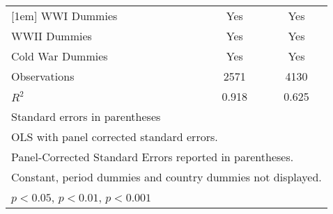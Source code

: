 \begin{table}[!htbp]
{\begin{tabular}{l*{2}{c}}
			[1em]
			WWI Dummies         &         Yes         &         Yes         \\
			[1em]
			WWII Dummies        &         Yes         &         Yes         \\
			[1em]
			Cold War Dummies    &         Yes         &         Yes         \\
			\hline
			Observations        &        2571         &        4130         \\
			\(R^{2}\)           &       0.918         &       0.625         \\
			\hline
			\multicolumn{7}{l}{\footnotesize Standard errors in parentheses}\\
			\multicolumn{7}{l}{\footnotesize OLS with panel corrected standard errors.}\\ 
			\multicolumn{7}{l}{\footnotesize Panel-Corrected Standard Errors reported in parentheses.}\\
			\multicolumn{7}{l}{\footnotesize Constant, period dummies and country dummies not displayed.}\\
			\multicolumn{7}{l}{\footnotesize \sym{*} \(p<0.05\), \sym{**} \(p<0.01\), \sym{***} \(p<0.001\)}\\
			\bottomrule
		\end{tabular}
	}
	\label{tab:table2}
\end{table}